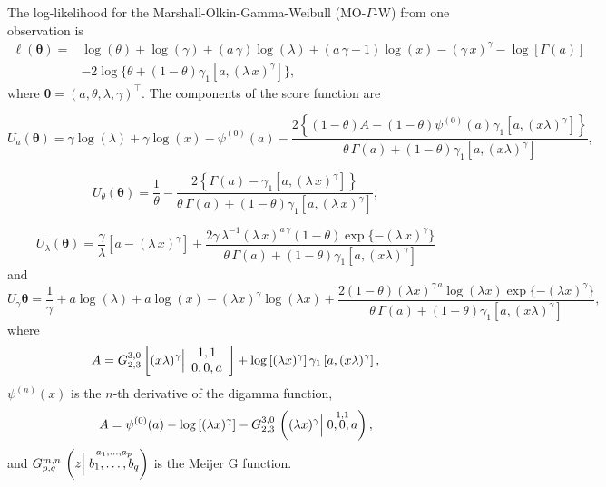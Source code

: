 \documentclass[12pt,a4paper]{article} %
\begin{document}
The log-likelihood for the Marshall-Olkin-Gamma-Weibull (MO-$\Gamma$-W) from one observation is
\begin{align}
\ell (\boldsymbol{\theta})=& \log (\theta)+\log (\gamma)+(a\,\gamma)\log (\lambda)+(a\,\gamma-1)\log(x)-(\gamma\, x)^\gamma-\log[\Gamma(a)]\nonumber \\ &-2\log\{\theta+(1-\theta)\gamma_1[a,(\lambda\,x)^\gamma]\},
\end{align}
where $\boldsymbol{\theta}=(a,\theta,\lambda,\gamma)^\top$. The components of the score function are

\begin{equation*}
U_{a}(\boldsymbol{\theta})=\gamma  \log (\lambda )+\gamma  \log (x)-\psi ^{(0)}(a)-\frac{2\left\{(1-\theta ) A-(1-\theta ) \psi ^{(0)}(a) \gamma_1 \left[a,(x \lambda
   )^{\gamma }\right]\right\}}{\theta\,\Gamma(a)+(1-\theta)\gamma_1\left[a,(x \lambda
   )^{\gamma }\right]},
\end{equation*}

\begin{equation*}
U_{\theta}(\boldsymbol{\theta})=\frac{1}{\theta}-\frac{2\left\{\Gamma(a)-\gamma_1\left[a,(\lambda\,x)^\gamma\right]\right\}}{\theta\,\Gamma(a)+(1-\theta)\gamma_1\left[a,(\lambda\,x)^\gamma\right]},
\end{equation*}

\begin{equation*}
U_{\lambda}(\boldsymbol{\theta})=\frac{\gamma }{\lambda }\left[a-(\lambda\,x)^\gamma\right]+\frac{2 \gamma \,\lambda^{-1}(\lambda\,x)^{a\,\gamma} (1-\theta )\exp\{-(\lambda\,x)^\gamma\} }{\theta \,\Gamma(a)+(1-\theta )
   \gamma_1 \left[a,(x \lambda )^{\gamma }\right]}
\end{equation*}
and
\begin{equation*}		
U_{\gamma}\boldsymbol{\theta}=\frac{1}{\gamma }+a \log (\lambda )+a \log (x)-(\lambda  x)^{\gamma } \log
   (\lambda  x)+\frac{2 (1-\theta )(\lambda
   x)^{\gamma\,a } \log (\lambda  x)\exp\{-(\lambda  x)^{\gamma }\}  }{\theta \,\Gamma(a)+(1-\theta )
   \gamma_1 \left[a,(x \lambda )^{\gamma }\right]},
\end{equation*}
where
\begin{align*}
A=G_{2,3}^{3,0}\left[(x \lambda )^{\gamma }\Big{|}
\begin{array}{c}
 1,1 \\
 0,0,a \\
\end{array}
\right]+\log \left[(\lambda  x)^{\gamma }\right] \gamma_1 \left[a,(x \lambda )^{\gamma
   }\right],
\end{align*}
$\psi^{(n)}(x)$ is the $n$-th derivative of the digamma function,
\begin{eqnarray*}
A=\psi^{(0)}(a) - \log\left[(\lambda x)^{\gamma}\right]-G^{3,0}_{2,3}\,\left((\lambda x)^{\gamma} \Big{|}	\stackrel{1,1}{0,0,a}\right),
\end{eqnarray*}
and $G^{m,n}_{p,q}\,\left(z \Big{|}	\stackrel{a_{1},\ldots,a_{p}}{b_{1},\ldots,b_{q}}\right)$ is the Meijer G function.
\end{document}
